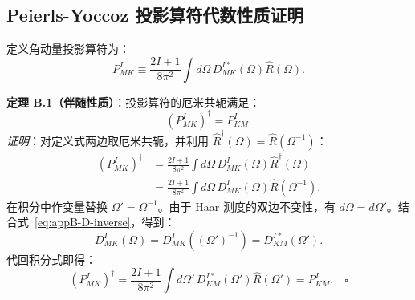 \subsection{Peierls-Yoccoz 投影算符代数性质证明}

定义角动量投影算符为：
\begin{equation}\label{eq:appB-proj-def}
P^I_{MK} \equiv \frac{2I+1}{8\pi^2} \int d\Omega \, D^{I*}_{MK}(\Omega) \hat{R}(\Omega).
\end{equation}

\textbf{定理 B.1（伴随性质）}：投影算符的厄米共轭满足：
\begin{equation}\label{eq:appB-proj-adjoint}
(P^I_{MK})^\dagger = P^I_{KM}.
\end{equation}
\textit{证明}：对定义式两边取厄米共轭，并利用 $\hat{R}^\dagger(\Omega) = \hat{R}(\Omega^{-1})$：
\begin{align}
(P^I_{MK})^\dagger &= \frac{2I+1}{8\pi^2} \int d\Omega \, D^I_{MK}(\Omega) \hat{R}^\dagger(\Omega) \nonumber \\
&= \frac{2I+1}{8\pi^2} \int d\Omega \, D^I_{MK}(\Omega) \hat{R}(\Omega^{-1}).
\end{align}
在积分中作变量替换 $\Omega' = \Omega^{-1}$。由于 Haar 测度的双边不变性，有 $d\Omega = d\Omega'$。结合式~\eqref{eq:appB-D-inverse}，得到：
\begin{equation}
D^I_{MK}(\Omega) = D^I_{MK}((\Omega')^{-1}) = D^{I*}_{KM}(\Omega').
\end{equation}
代回积分式即得：
\begin{equation}
(P^I_{MK})^\dagger = \frac{2I+1}{8\pi^2} \int d\Omega' \, D^{I*}_{KM}(\Omega') \hat{R}(\Omega') = P^I_{KM}. \quad \square
\end{equation}

